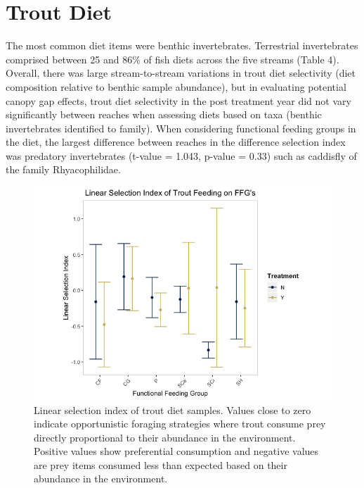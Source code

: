 \documentclass[double,12pt]{beavtex}
\begin{document}
  \section*{Trout Diet}\label{trout-diet}
  
  The most common diet items were benthic invertebrates. Terrestrial
  invertebrates comprised between 25 and 86\% of fish diets across the
  five streams (Table 4). Overall, there was large stream-to-stream
  variations in trout diet selectivity (diet composition relative to
  benthic sample abundance), but in evaluating potential canopy gap
  effects, trout diet selectivity in the post treatment year did not vary
  significantly between reaches when assessing diets based on taxa
  (benthic invertebrates identified to family). When considering
  functional feeding groups in the diet, the largest difference between
  reaches in the difference selection index was predatory invertebrates
  (t-value = 1.043, p-value = 0.33) such as caddisfly of the family
  Rhyacophilidae.
  
  \begin{figure}
  
  {\centering \includegraphics[width=1\linewidth]{Figures/Diet-FFG-D-1} 
  
  }
  
  \caption[Linear selection index of trout diet samples]{Linear selection index of trout diet samples. Values close to zero indicate opportunistic foraging strategies where trout consume prey directly proportional to their abundance in the environment. Positive values show preferential consumption and negative values are prey items consumed less than expected based on their abundance in the environment.}\label{fig:unnamed-chunk-5}
  \end{figure}
  
\end{document}
